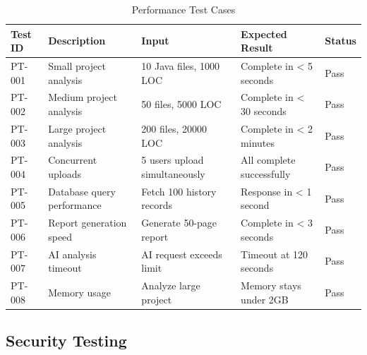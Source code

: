 \documentclass[12pt,a4paper]{article}
\begin{document}
    \begin{table}[H]
        \caption{Performance Test Cases}
        \begin{tabular}{|p{2cm}|p{4cm}|p{3cm}|p{3cm}|p{1.5cm}|}
            \hline
            \textbf{Test ID} & \textbf{Description} & \textbf{Input} & \textbf{Expected Result} & \textbf{Status} \\
            \hline
            PT-001 & Small project analysis & 10 Java files, 1000 LOC & Complete in < 5 seconds & Pass \\
            \hline
            PT-002 & Medium project analysis & 50 files, 5000 LOC & Complete in < 30 seconds & Pass \\
            \hline
            PT-003 & Large project analysis & 200 files, 20000 LOC & Complete in < 2 minutes & Pass \\
            \hline
            PT-004 & Concurrent uploads & 5 users upload simultaneously & All complete successfully & Pass \\
            \hline
            PT-005 & Database query performance & Fetch 100 history records & Response in < 1 second & Pass \\
            \hline
            PT-006 & Report generation speed & Generate 50-page report & Complete in < 3 seconds & Pass \\
            \hline
            PT-007 & AI analysis timeout & AI request exceeds limit & Timeout at 120 seconds & Pass \\
            \hline
            PT-008 & Memory usage & Analyze large project & Memory stays under 2GB & Pass \\
            \hline
        \end{tabular}
    \end{table}

    \subsection{Security Testing}
\end{document}
